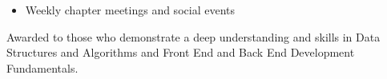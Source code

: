 \documentclass[10pt,a4paper,ragged2e,withhyper]{altacv}
\begin{document}
\begin{paracol}{2}
\begin{itemize}
\item Weekly chapter meetings and
social events
\end{itemize}

    \smallskip

Awarded to those who demonstrate a deep understanding and skills in Data Structures and Algorithms and Front End and Back End Development Fundamentals.




    \end{paracol}





\end{document}
